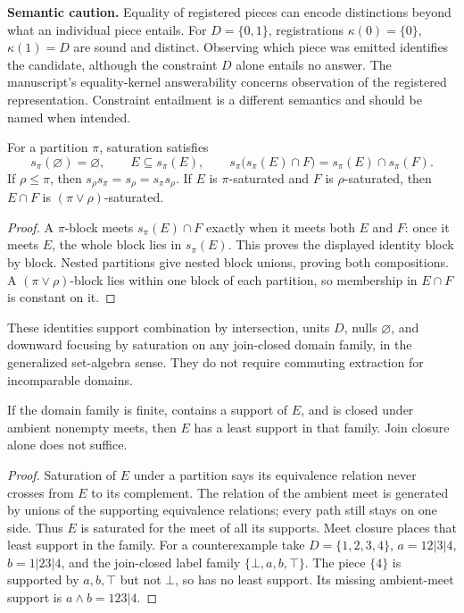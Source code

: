 \textbf{Semantic caution.} Equality of registered pieces can encode distinctions beyond what an individual piece entails. For $D=\{0,1\}$, registrations $\kappa(0)=\{0\}$, $\kappa(1)=D$ are sound and distinct. Observing which piece was emitted identifies the candidate, although the constraint $D$ alone entails no answer. The manuscript's equality-kernel answerability concerns observation of the registered representation. Constraint entailment is a different semantics and should be named when intended.


\begin{thmplain}
For a partition $\pi$, saturation satisfies
\[
s_\pi(\varnothing)=\varnothing,\qquad E\subseteq s_\pi(E),\qquad s_\pi\bigl(s_\pi(E)\cap F\bigr)=s_\pi(E)\cap s_\pi(F).
\]
If $\rho\le\pi$, then $s_\rho s_\pi=s_\rho=s_\pi s_\rho$. If $E$ is $\pi$-saturated and $F$ is $\rho$-saturated, then $E\cap F$ is $(\pi\vee\rho)$-saturated.
\end{thmplain}
\begin{proof}
A $\pi$-block meets $s_\pi(E)\cap F$ exactly when it meets both $E$ and $F$: once it meets $E$, the whole block lies in $s_\pi(E)$. This proves the displayed identity block by block. Nested partitions give nested block unions, proving both compositions. A $(\pi\vee\rho)$-block lies within one block of each partition, so membership in $E\cap F$ is constant on it.
\end{proof}

These identities support combination by intersection, units $D$, nulls $\varnothing$, and downward focusing by saturation on any join-closed domain family, in the generalized set-algebra sense. They do not require commuting extraction for incomparable domains.

\begin{thmplain}
If the domain family is finite, contains a support of $E$, and is closed under ambient nonempty meets, then $E$ has a least support in that family. Join closure alone does not suffice.
\end{thmplain}
\begin{proof}
Saturation of $E$ under a partition says its equivalence relation never crosses from $E$ to its complement. The relation of the ambient meet is generated by unions of the supporting equivalence relations; every path still stays on one side. Thus $E$ is saturated for the meet of all its supports. Meet closure places that least support in the family. For a counterexample take $D=\{1,2,3,4\}$, $a=12|3|4$, $b=1|23|4$, and the join-closed label family $\{\bot,a,b,\top\}$. The piece $\{4\}$ is supported by $a,b,\top$ but not $\bot$, so has no least support. Its missing ambient-meet support is $a\wedge b=123|4$.
\end{proof}

